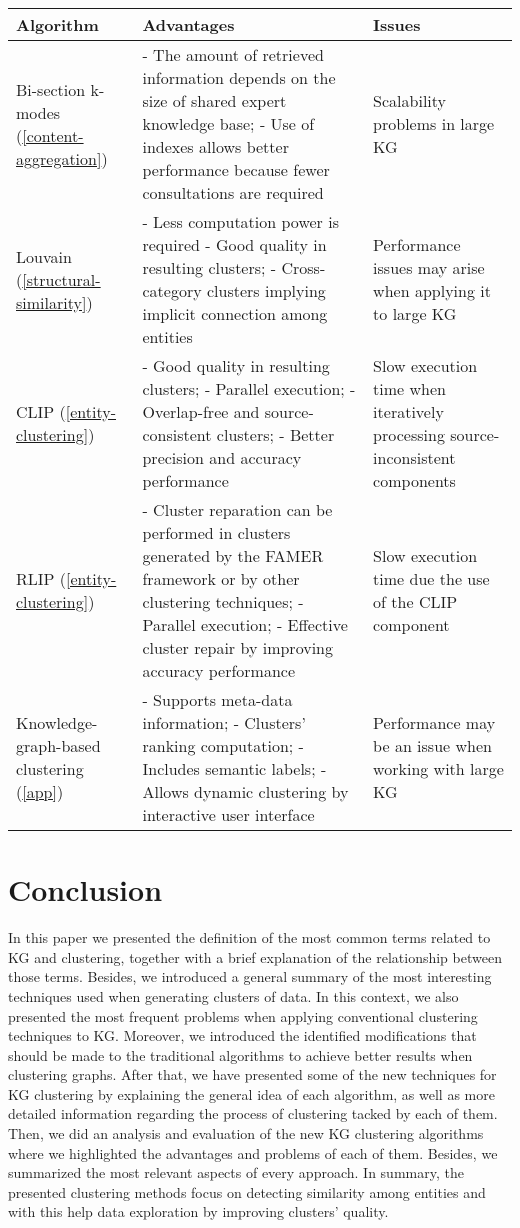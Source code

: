 \documentclass[runningheads]{llncs}
\begin{document}
 \label{table2}
\begin{tabular}{|p{3cm}|p{8.5cm}|p{3.5cm}|}
 \hline
\textbf{Algorithm} & \textbf{Advantages} & \textbf{Issues}\\
 \hline
 Bi-section k-modes (\ref{content-aggregation}) & - The amount of retrieved information depends on the size of shared expert knowledge base; - Use of indexes allows better performance because fewer consultations are required & Scalability problems in large KG \\
 \hline
 Louvain (\ref{structural-similarity}) & - Less computation power is required - Good quality in resulting clusters; - Cross-category clusters implying implicit connection among entities & Performance issues may arise when applying it to large KG \\
 \hline
 CLIP (\ref{entity-clustering}) & - Good quality in resulting clusters; - Parallel execution; - Overlap-free and source-consistent clusters; - Better precision and accuracy performance & Slow execution time when iteratively processing source-inconsistent components \\
 \hline
 RLIP (\ref{entity-clustering}) & - Cluster reparation can be performed in clusters generated by the FAMER framework or by other clustering techniques; - Parallel execution; - Effective cluster repair by improving accuracy performance & Slow execution time due the use of the CLIP component\\ 
 \hline
 Knowledge-graph-based clustering (\ref{app}) & - Supports meta-data information; - Clusters' ranking computation; - Includes semantic labels; - Allows dynamic clustering by interactive user interface & Performance may be an issue when working with large KG \\
 \hline
\end{tabular}

\section{Conclusion} \label{conclusion}
In this paper we presented the definition of the most common terms related to KG and clustering, together with a brief explanation of the relationship between those terms. Besides, we introduced a general summary of the most interesting techniques used when generating clusters of data.
In this context, we also presented the most frequent problems when applying conventional clustering techniques to KG. Moreover, we introduced the identified modifications that should be made to the traditional algorithms to achieve better results when clustering graphs. After that, we have presented some of the new techniques for KG clustering by explaining the general idea of each algorithm, as well as more detailed information regarding the process of clustering tacked by each of them.
Then, we did an analysis and evaluation of the new KG clustering algorithms where we highlighted the advantages and problems of each of them. Besides, we summarized the most relevant aspects of every approach.
In summary, the presented clustering methods focus on detecting similarity among entities and with this help data exploration by improving clusters' quality.
\end{document}
